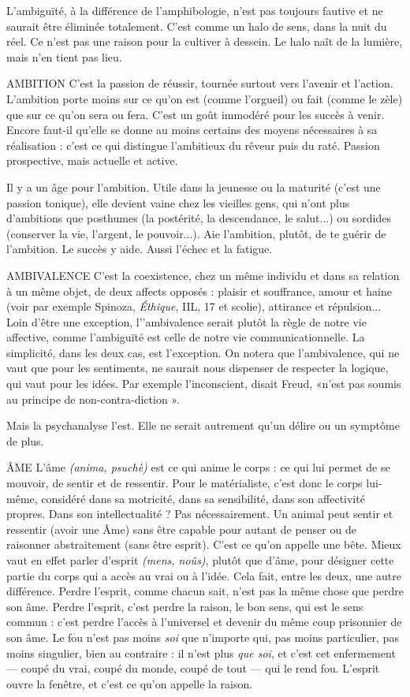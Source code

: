 L’ambiguïté, à la différence de l’amphibologie, n’est pas toujours fautive et
ne saurait être éliminée totalement. C’est comme un halo de sens, dans la nuit
du réel. Ce n’est pas une raison pour la cultiver à dessein. Le halo naît de la
lumière, mais n’en tient pas lieu.

AMBITION C'est la passion de réussir, tournée surtout vers l’avenir et l’action.
L’ambition porte moins sur ce qu’on est (comme l’orgueil) ou fait (comme
le zèle) que sur ce qu’on sera ou fera. C’est un goût immodéré pour les succès
à venir. Encore faut-il qu’elle se donne au moins certains des moyens nécessaires
à sa réalisation : c’est ce qui distingue l’ambitieux du rêveur puis du raté.
Passion prospective, mais actuelle et active.

Il y a un âge pour l’ambition. Utile dans la jeunesse ou la maturité (c’est
une passion tonique), elle devient vaine chez les vieilles gens, qui n’ont plus
d’ambitions que posthumes (la postérité, la descendance, le salut...) ou sordides
(conserver la vie, l'argent, le pouvoir...). Aie l'ambition, plutôt, de te
guérir de l’ambition. Le succès y aide. Aussi l’échec et la fatigue.

AMBIVALENCE C'est la coexistence, chez un même individu et dans sa relation
à un même objet, de deux affects opposés : plaisir et
souffrance, amour et haine (voir par exemple Spinoza, {\it Éthique}, IIL, 17 et
scolie), attirance et répulsion... Loin d’être une exception, l’'ambivalence serait
plutôt la règle de notre vie affective, comme l'ambiguïté est celle de notre vie
communicationnelle. La simplicité, dans les deux cas, est l’exception.
On notera que l’ambivalence, qui ne vaut que pour les sentiments, ne saurait
nous dispenser de respecter la logique, qui vaut pour les idées. Par exemple
l'inconscient, disait Freud, «n’est pas soumis au principe de non-contra-diction ».

Mais la psychanalyse l’est. Elle ne serait autrement qu’un délire ou
un symptôme de plus.

ÂME L'âme {\it (anima, psuchè)} est ce qui anime le corps : ce qui lui permet de se
mouvoir, de sentir et de ressentir. Pour le matérialiste, c’est donc le
corps lui-même, considéré dans sa motricité, dans sa sensibilité, dans son affectivité
propres. Dans son intellectualité ? Pas nécessairement. Un animal peut
sentir et ressentir (avoir une Âme) sans être capable pour autant de penser ou de
raisonner abstraitement (sans être esprit). C’est ce qu’on appelle une bête.
Mieux vaut en effet parler d'esprit {\it (mens, noûs)}, plutôt que d’âme, pour désigner
cette partie du corps qui a accès au vrai ou à l’idée. Cela fait, entre les
deux, une autre différence. Perdre l'esprit, comme chacun sait, n’est pas la
même chose que perdre son âme. Perdre l'esprit, c’est perdre la raison, le bon
sens, qui est le sens commun : c’est perdre l'accès à l’universel et devenir du
même coup prisonnier de son âme. Le fou n’est pas moins {\it soi} que n'importe
qui, pas moins particulier, pas moins singulier, bien au contraire : il n'est plus
{\it que soi}, et c’est cet enfermement — coupé du vrai, coupé du monde, coupé de
tout — qui le rend fou. L'esprit ouvre la fenêtre, et c’est ce qu’on appelle la
raison.

